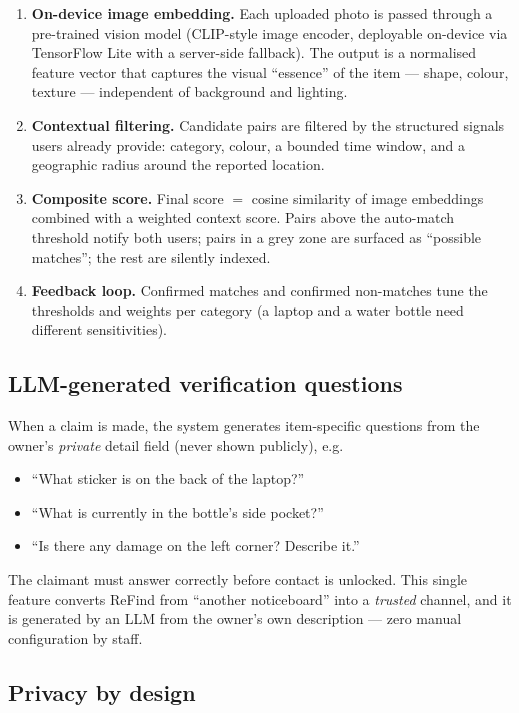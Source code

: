 \documentclass[11pt,a4paper]{article}
\begin{document}
\begin{enumerate}
  \item \textbf{On-device image embedding.} Each uploaded photo is passed through a
        pre-trained vision model (CLIP-style image encoder, deployable on-device via
        TensorFlow Lite with a server-side fallback). The output is a normalised feature
        vector that captures the visual ``essence'' of the item --- shape, colour, texture
        --- independent of background and lighting.
  \item \textbf{Contextual filtering.} Candidate pairs are filtered by the structured
        signals users already provide: category, colour, a bounded time window, and a
        geographic radius around the reported location.
  \item \textbf{Composite score.} Final score $=$ cosine similarity of image embeddings
        combined with a weighted context score. Pairs above the auto-match threshold notify
        both users; pairs in a grey zone are surfaced as ``possible matches''; the rest are
        silently indexed.
  \item \textbf{Feedback loop.} Confirmed matches and confirmed non-matches tune the
        thresholds and weights per category (a laptop and a water bottle need different
        sensitivities).
\end{enumerate}

\subsection{LLM-generated verification questions}

When a claim is made, the system generates item-specific questions from the owner's
\emph{private} detail field (never shown publicly), e.g.\
\begin{itemize}
  \item ``What sticker is on the back of the laptop?''
  \item ``What is currently in the bottle's side pocket?''
  \item ``Is there any damage on the left corner? Describe it.''
\end{itemize}
The claimant must answer correctly before contact is unlocked. This single feature converts
ReFind from ``another noticeboard'' into a \emph{trusted} channel, and it is generated by an
LLM from the owner's own description --- zero manual configuration by staff.

\subsection{Privacy by design}
\label{sec:privacy}
\end{document}
